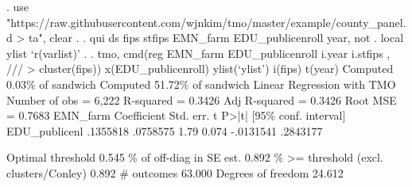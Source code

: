 . use "https://raw.githubusercontent.com/wjnkim/tmo/master/example/county_panel.d
> ta", clear
{\smallskip}
. 
. qui ds fips stfips EMN_farm EDU_publicenroll year, not
{\smallskip}
. local ylist `r(varlist)'
{\smallskip}
. 
. tmo, cmd(reg EMN_farm EDU_publicenroll i.year i.stfips , ///
> cluster(fips)) x(EDU_publicenroll) ylist(`ylist') i(fips) t(year)
Computed 0.03\% of sandwich
Computed 51.72\% of sandwich
{\smallskip}
Linear Regression with TMO                              Number of obs =  6,222
                                                        R-squared     = 0.3426
                                                        Adj R-squared = 0.3426
                                                        Root MSE      = 0.7683
{\smallskip}
      EMN_farm {\VBAR} Coefficient  Std. err.      t    P>|t|     [95\% conf. interval]
EDU_publicen{\tytilde}l {\VBAR}   .1355818   .0758575     1.79   0.074    -.0131541    .2843177
                                                                               
                                                   Optimal threshold      0.545
                                            \% of off-diag in SE est.      0.892
                              \% >= threshold (excl. clusters/Conley)      0.892
                                                          \# outcomes     63.000
                                                  Degrees of freedom     24.612
